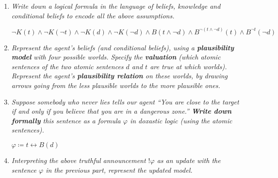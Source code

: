 \documentclass[leqno]{article}
\begin{document}
\begin{enumerate}
    \item \textit{Write down a logical formula in the language of beliefs,
    knowledge and conditional beliefs to encode all the above assumptions.}
    
    $\neg K(t) \land \neg K(\neg t) \land \neg K(d) \land \neg K(\neg d) \land
    B(t \land \neg d) \land B^{\neg (t \land \neg d)}(t) \land 
    B^{\neg t}(\neg d)$

    \item \textit{Represent the agent's beliefs (and conditional beliefs),
    using a \textbf{plausibility model} with four possible worlds. Specify the 
    \textbf{valuation} (which atomic sentences of the two atomic sentences $d$ 
    and $t$ are true at which worlds). Represent the agent's 
    \textbf{plausibility relation} on these worlds, by drawing arrows going 
    from the less plausible worlds to the more plausible ones.}

    \begin{center}
    \end{center}

    \item \textit{Suppose somebody who never lies tells our agent ``You are 
    close to the target if and only if you believe that you are in a dangerous 
    zone.'' \textbf{Write down formally} this sentence as a formula $\varphi$ 
    in doxastic logic (using the atomic sentences).}

    $\varphi \coloneqq t \leftrightarrow B(d)$

    \item \textit{Interpreting the above truthful announcement $!\varphi$ as an
    update with the sentence $\varphi$ in the previous part, represent the
    updated model.}


\end{enumerate}
\end{document}
